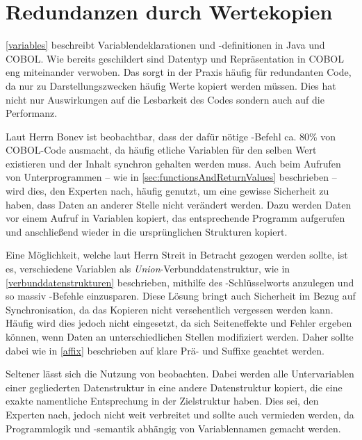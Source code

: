 \section{Redundanzen durch Wertekopien}
\autoref{variables} beschreibt Variablendeklarationen und -definitionen in Java und COBOL. Wie bereits geschildert sind Datentyp und Repräsentation in COBOL eng miteinander verwoben. Das sorgt in der Praxis häufig für redundanten Code, da nur zu Darstellungszwecken häufig Werte kopiert werden müssen. Dies hat nicht nur Auswirkungen auf die Lesbarkeit des Codes sondern auch auf die Performanz.

Laut Herrn Bonev ist beobachtbar, dass der dafür nötige -Befehl ca. 80\% von COBOL-Code ausmacht, da häufig etliche Variablen für den selben Wert existieren und der Inhalt synchron gehalten werden muss. Auch beim Aufrufen von Unterprogrammen -- wie in \autoref{sec:functionsAndReturnValues} beschrieben -- wird dies, den Experten nach, häufig genutzt, um eine gewisse Sicherheit zu haben, dass Daten an anderer Stelle nicht verändert werden. Dazu werden Daten vor einem Aufruf in Variablen kopiert, das entsprechende Programm aufgerufen und anschließend wieder in die ursprünglichen Strukturen kopiert. 

Eine Möglichkeit, welche laut Herrn Streit in Betracht gezogen werden sollte, ist es, verschiedene Variablen als \textit{Union}-Verbunddatenstruktur, wie in \autoref{verbunddatenstrukturen} beschrieben, mithilfe des -Schlüsselworts anzulegen und so massiv -Befehle einzusparen. Diese Lösung bringt auch Sicherheit im Bezug auf Synchronisation, da das Kopieren nicht versehentlich vergessen werden kann. Häufig wird dies jedoch nicht eingesetzt, da sich Seiteneffekte und Fehler ergeben können, wenn Daten an unterschiedlichen Stellen modifiziert werden. Daher sollte dabei wie in \autoref{affix} beschrieben auf klare Prä- und Suffixe geachtet werden.

Seltener lässt sich die Nutzung von  beobachten. Dabei werden alle Untervariablen einer gegliederten Datenstruktur in eine andere Datenstruktur kopiert, die eine exakte namentliche Entsprechung in der Zielstruktur haben. Dies sei, den Experten nach, jedoch nicht weit verbreitet und sollte auch vermieden werden, da Programmlogik und -semantik abhängig von Variablennamen gemacht werden.